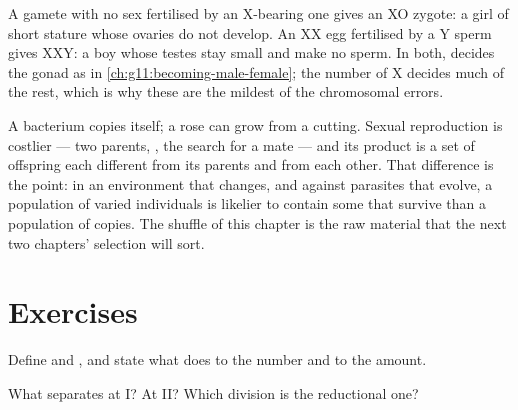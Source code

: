 \begin{example}\label{ex:g12:meiosis-genetic-shuffling:sexchrom}
A gamete with no sex  fertilised by an X-bearing one gives
an XO zygote: a girl of short stature whose ovaries do not develop.
An XX egg fertilised by a Y sperm gives XXY: a boy whose testes stay
small and make no sperm. In both,  decides the gonad as in
\cref{ch:g11:becoming-male-female}; the number of X 
decides much of the rest, which is why these are the mildest of the
chromosomal errors.
\end{example}

\begin{remark}\label{rem:g12:meiosis-genetic-shuffling:whysex}
A bacterium copies itself; a rose can grow from a cutting. Sexual
reproduction is costlier --- two parents, , the search for a
mate --- and its product is a set of offspring each different from
its parents and from each other. That difference is the point: in an
environment that changes, and against parasites that evolve, a
population of varied individuals is likelier to contain some that
survive than a population of copies. The shuffle of this chapter is
the raw material that the next two chapters' selection will sort.
\end{remark}

\section{Exercises}

\begin{exercise}[$\star$]\label{exo:g12:meiosis-genetic-shuffling:1}
Define  and , and state what  does to the
 number and to the  amount.
\end{exercise}

\begin{exercise}[$\star$]\label{exo:g12:meiosis-genetic-shuffling:2}
What separates at  I? At  II? Which division is the
reductional one?
\end{exercise}

